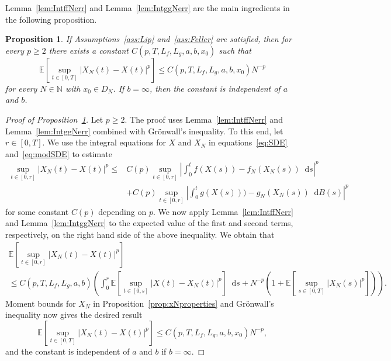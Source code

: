 \documentclass[11pt]{amsart}
\newtheorem{proposition}[theorem]{Proposition}
\newcommand{\E}{{\mathbb E}}
\newcommand*\diff{\mathop{}\!\mathrm{d}}
\newcommand{\DDN}{D_{N}}
\begin{document}
{Lemma~\ref{lem:IntffNerr} and Lemma~\ref{lem:IntggNerr} are the main ingredients in the following proposition.
\begin{proposition}\label{prop:ModSDELpConv}
If Assumptions~\ref{ass:Lip} and~\ref{ass:Feller} are satisfied, then for every $p \geq 2$ there exists a constant $C(p,T,L_{f},L_{g},a,b,x_{0})$ such that
\begin{equation*}
\E \left[ \sup_{t \in [0,T]} |X_{N}(t) - X(t)|^{p} \right] \leq C(p,T,L_{f},L_{g},a,b,x_{0}) N^{-p}
\end{equation*}
for every $N \in \mathbb{N}$ with $x_{0} \in \DDN$. If $b=\infty$, then the constant is independent of $a$ and $b$.
\end{proposition}
\begin{proof}[Proof of Proposition~\ref{prop:ModSDELpConv}]
Let $p \geq 2$. The proof uses Lemma~\ref{lem:IntffNerr} and Lemma~\ref{lem:IntggNerr} combined with Grönwall's inequality. To this end, let $r \in [0,T]$. We use the integral equations for $X$ and $X_{N}$ in equations~\eqref{eq:SDE} and~\eqref{eq:modSDE} to estimate
\begin{align*}
\sup_{t \in [0,r]} \left| X_{N}(t) - X(t) \right|^{p} \leq & C(p) \sup_{t \in [0,r]} \left| \int_{0}^{t} f(X(s)) - f_{N}(X_{N}(s)) \diff s \right|^{p} \\&+ C(p) \sup_{t \in [0,r]} \left| \int_{0}^{t} g(X(s))) - g_{N}(X_{N}(s)) \diff B(s) \right|^{p}
\end{align*}
for some constant $C(p)$ depending on $p$. We now apply Lemma~\ref{lem:IntffNerr} and Lemma~\ref{lem:IntggNerr} to the expected value of the first and second terms, respectively, on the right hand side of the above inequality. We obtain that
\begin{multline*}
\E \left[ \sup_{t \in [0,r]} \left| X_{N}(t) - X(t) \right|^{p} \right] \\ \leq C(p,T,L_{f},L_{g},a,b) \left( \int_{0}^{r} \E \left[ \sup_{t \in [0,s]} \left| X(t) - X_{N}(t) \right|^{p}  \right] \diff s + N^{-p} \left( 1 + \E \left[ \sup_{s \in [0,T]} |X_{N}(s)|^{p} \right] \right) \right).
\end{multline*}
Moment bounds for $X_{N}$ in Proposition~\ref{prop:xNproperties} and Grönwall's inequality now gives the desired result
\begin{equation*}
\E \left[ \sup_{t \in [0,T]} \left| X_{N}(t) - X(t) \right|^{p} \right] \leq C(p,T,L_{f},L_{g},a,b,x_{0}) N^{-p},
\end{equation*}
and the constant is independent of $a$ and $b$ if $b=\infty$.
\end{proof}

}
\end{document}
